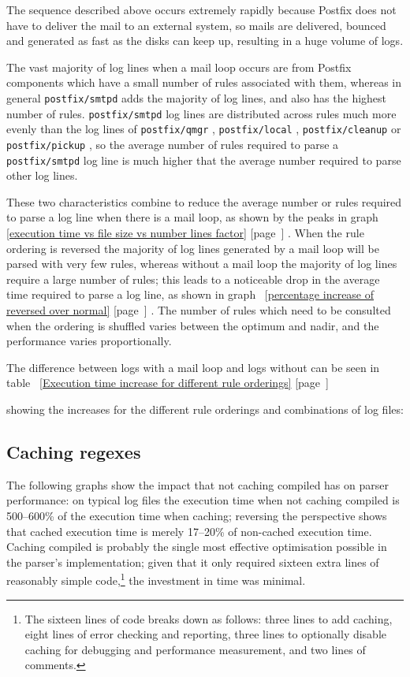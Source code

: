\documentclass[a4paper,12pt,draft]{article}
\newcommand{\refwithpage}[1]{%
    \empty{}\ref{#1} [page~\pageref{#1}]%
}
\newcommand{\daemon}[1]{%
    \texttt{postfix/#1}%
}
\begin{document}
The sequence described above occurs extremely rapidly because Postfix does
not have to deliver the mail to an external system, so mails are delivered,
bounced and generated as fast as the disks can keep up, resulting in a huge
volume of logs.

The vast majority of log lines when a mail loop occurs are from Postfix
components which have a small number of rules associated with them, whereas
in general \daemon{smtpd} adds the majority of log lines, and also has the
highest number of rules.  \daemon{smtpd} log lines are distributed across
rules much more evenly than the log lines of \daemon{qmgr}, \daemon{local},
\daemon{cleanup} or \daemon{pickup}, so the average number of rules
required to parse a \daemon{smtpd} log line is much higher that the average
number required to parse other log lines.

These two characteristics combine to reduce the average number or rules
required to parse a log line when there is a mail loop, as shown by the
peaks in graph~\refwithpage{execution time vs file size vs number lines
factor}.  When the rule ordering is reversed the majority of log lines
generated by a mail loop will be parsed with very few rules, whereas
without a mail loop the majority of log lines require a large number of
rules; this leads to a noticeable drop in the average time required to
parse a log line, as shown in graph~\refwithpage{percentage increase of
reversed over normal}.  The number of rules which need to be consulted when
the ordering is shuffled varies between the optimum and nadir, and the
performance varies proportionally.

The difference between logs with a mail loop and logs without can be seen
in table~\refwithpage{Execution time increase for different rule orderings}
showing the increases for the different rule orderings and combinations of
log files:



\subsection{Caching regexes}

\label{Caching regexes}

The following graphs show the impact that not caching compiled \regexes{}
has on parser performance: on typical log files the execution time when not
caching compiled \regexes{} is 500--600\% of the execution time when
caching; reversing the perspective shows that cached execution time is
merely 17--20\% of non-cached execution time.  Caching compiled \regexes{}
is probably the single most effective optimisation possible in the parser's
implementation; given that it only required sixteen extra lines of
reasonably simple code,\footnote{The sixteen lines of code breaks down as
follows: three lines to add caching, eight lines of error checking and
reporting, three lines to optionally disable caching for debugging and
performance measurement, and two lines of comments.} the investment in time
was minimal.
\end{document}

